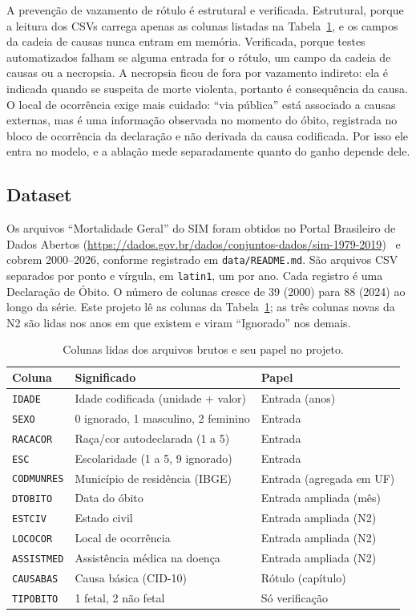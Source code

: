 \documentclass[12pt]{article}
\begin{document}
A prevenção de vazamento de rótulo é estrutural e verificada. Estrutural, porque a leitura dos CSVs carrega apenas as colunas listadas na Tabela~\ref{tab:colunas}, e os campos da cadeia de causas nunca entram em memória. Verificada, porque testes automatizados falham se alguma entrada for o rótulo, um campo da cadeia de causas ou a necropsia. A necropsia ficou de fora por vazamento indireto: ela é indicada quando se suspeita de morte violenta, portanto é consequência da causa. O local de ocorrência exige mais cuidado: ``via pública'' está associado a causas externas, mas é uma informação observada no momento do óbito, registrada no bloco de ocorrência da declaração e não derivada da causa codificada. Por isso ele entra no modelo, e a ablação mede separadamente quanto do ganho depende dele.

\subsection{Dataset}
\label{sec:dataset}

Os arquivos ``Mortalidade Geral'' do SIM foram obtidos no Portal Brasileiro de Dados Abertos (\url{https://dados.gov.br/dados/conjuntos-dados/sim-1979-2019})~\cite{sim_dadosgov} e cobrem 2000--2026, conforme registrado em \texttt{data/README.md}. São arquivos CSV separados por ponto e vírgula, em \texttt{latin1}, um por ano. Cada registro é uma Declaração de Óbito. O número de colunas cresce de 39 (2000) para 88 (2024) ao longo da série. Este projeto lê as colunas da Tabela~\ref{tab:colunas}; as três colunas novas da N2 são lidas nos anos em que existem e viram ``Ignorado'' nos demais.

\begin{table}[ht]
\centering
\caption{Colunas lidas dos arquivos brutos e seu papel no projeto.}
\label{tab:colunas}
\small
\begin{tabular}{|l|l|l|}
\hline
\textbf{Coluna} & \textbf{Significado} & \textbf{Papel} \\
\hline
\texttt{IDADE} & Idade codificada (unidade + valor) & Entrada (anos) \\
\texttt{SEXO} & 0 ignorado, 1 masculino, 2 feminino & Entrada \\
\texttt{RACACOR} & Raça/cor autodeclarada (1 a 5) & Entrada \\
\texttt{ESC} & Escolaridade (1 a 5, 9 ignorado) & Entrada \\
\texttt{CODMUNRES} & Município de residência (IBGE) & Entrada (agregada em UF) \\
\texttt{DTOBITO} & Data do óbito & Entrada ampliada (mês) \\
\texttt{ESTCIV} & Estado civil & Entrada ampliada (N2) \\
\texttt{LOCOCOR} & Local de ocorrência & Entrada ampliada (N2) \\
\texttt{ASSISTMED} & Assistência médica na doença & Entrada ampliada (N2) \\
\texttt{CAUSABAS} & Causa básica (CID-10) & Rótulo (capítulo) \\
\texttt{TIPOBITO} & 1 fetal, 2 não fetal & Só verificação \\
\hline
\end{tabular}
\end{table}
\end{document}
